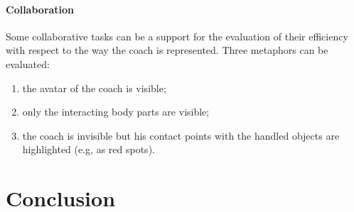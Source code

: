 \documentclass[a4paper]{article}
\begin{document}
\paragraph{Collaboration} Some collaborative tasks can be a support for the evaluation of their efficiency with respect to the way the coach is represented. Three metaphors can be evaluated:
\begin{enumerate}
	\item the avatar of the coach is visible;
	\item only the interacting body parts are visible;
	\item the coach is invisible but his contact points with the handled objects are highlighted (e.g, as red spots).
\end{enumerate}

\section{Conclusion}
\end{document}
